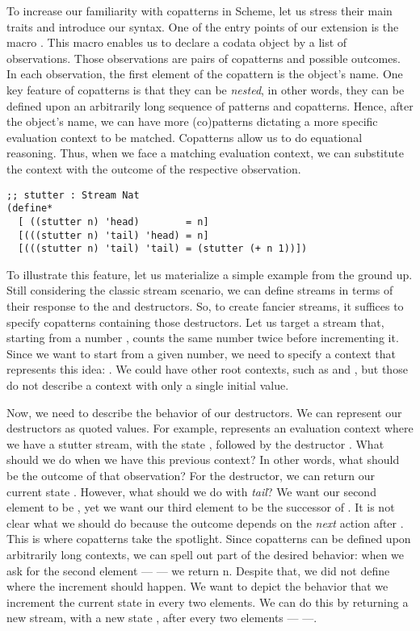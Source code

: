 To increase our familiarity with copatterns in Scheme, let us stress their main traits and introduce our syntax.
One of the entry points of our extension is the macro .
This macro enables us to declare a codata object by a list of observations.
Those observations are pairs of copatterns and possible outcomes.
In each observation, the first element of the copattern is the object's name.
One key feature of copatterns is that they can be \emph{nested}, in other words, they can be defined upon an arbitrarily long sequence of patterns and copatterns.
Hence, after the object's name, we can have more (co)patterns dictating a more specific evaluation context to be matched.
Copatterns allow us to do equational reasoning. Thus, when we face a matching evaluation context, we can substitute the context with the outcome of the respective observation.

\begin{verbatim}
;; stutter : Stream Nat
(define*
  [ ((stutter n) 'head)        = n]
  [(((stutter n) 'tail) 'head) = n]
  [(((stutter n) 'tail) 'tail) = (stutter (+ n 1))])
\end{verbatim}

To illustrate this feature, let us materialize a simple example from the ground up.
Still considering the classic stream scenario, we can define streams in terms of their response to the  and  destructors. 
So, to create fancier streams, it suffices to specify copatterns containing those destructors.
Let us target a stream that, starting from a number , counts the same number twice before incrementing it. 
Since we want to start from a given number, we need to specify a context that represents this idea: .
We could have other root contexts, such as  and , but those do not describe a context with only a single initial value.

Now, we need to describe the behavior of our destructors.
We can represent our destructors as quoted values.
For example,  represents an evaluation context where we have a stutter stream, with the state , followed by the destructor .
What should we do when we have this previous context?
In other words, what should be the outcome of that observation? 
For the  destructor, we can return our current state .
However, what should we do with \emph{tail}? We want our second element to be , yet we want our third element to be the successor of .
It is not clear what we should do because the outcome depends on the \emph{next} action after . 
This is where copatterns take the spotlight.
Since copatterns can be defined upon arbitrarily long contexts, we can spell out part of the desired behavior: when we ask for the second element ---  --- we return n.
Despite that, we did not define where the increment should happen.
We want to depict the behavior that we increment the current state in every two elements. 
We can do this by returning a new stream, with a new state , after every two elements ---  ---. 

